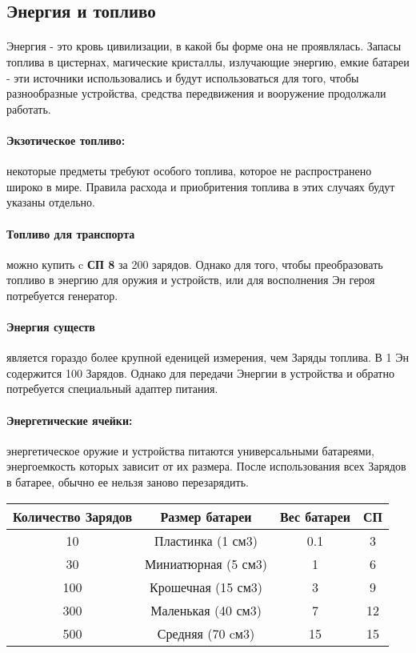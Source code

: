 \subsection{Энергия и топливо}
\paragraph{}
Энергия - это кровь цивилизации, в какой бы форме она не проявлялась. Запасы топлива в цистернах, магические кристаллы, излучающие энергию, емкие батареи - эти источники использовались и будут использоваться для того, чтобы разнообразные устройства, средства передвижения и вооружение продолжали работать.

\paragraph{Экзотическое топливо:} некоторые предметы требуют особого топлива, которое не распространено широко в мире. Правила расхода и приобритения топлива в этих случаях будут указаны отдельно.

\paragraph{Топливо для транспорта} можно купить c \textbf{СП 8} за 200 зарядов. Однако для того, чтобы преобразовать топливо в энергию для оружия и устройств, или для восполнения Эн героя потребуется генератор.

\paragraph{Энергия существ} является гораздо более крупной еденицей измерения, чем Заряды топлива. В 1 Эн содержится 100 Зарядов. Однако для передачи Энергии в устройства и обратно потребуется специальный адаптер питания.

\paragraph{Энергетические ячейки:} энергетическое оружие и устройства питаются универсальными батареями, энергоемкость которых зависит от их размера. После использования всех Зарядов в батарее, обычно ее нельзя заново перезарядить.
\begin{center}
\begin{tabular}{|c|c|c|c|}
\hline
Количество Зарядов & Размер батареи & Вес батареи & СП \\ \hline
10 & Пластинка (1 см3) & 0.1 & 3 \\ \hline
30 & Миниатюрная (5 см3) & 1 & 6 \\ \hline
100 & Крошечная (15 см3) & 3 & 9 \\ \hline
300 & Маленькая (40 см3) & 7 & 12 \\ \hline
500 & Средняя (70 cм3) & 15 & 15 \\ \hline
\end{tabular}
\end{center}
